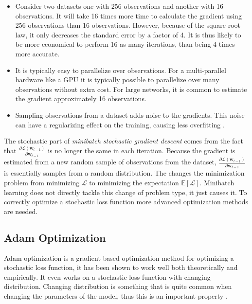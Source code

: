 \begin{itemize}
\item Consider two datasets one with 256 observations and another with 16 observations. It will take 16 times more time to calculate the gradient using 256 observations than 16 observations. However, because of the square-root law, it only decreases the standard error by a factor of 4. It is thus likely to be more economical to perform 16 as many iterations, than being 4 times more accurate.

\item It is typically easy to parallelize over observations. For a multi-parallel hardware like a GPU it is typically possible to parallelize over many observations without extra cost. For large networks, it is common to estimate the gradient approximately 16 observations.

\item Sampling observations from a dataset adds noise to the gradients. This noise can have a regularizing effect on the training, causing less overfitting \cite{deep-learning}.
\end{itemize}

The stochastic part of \textit{minibatch stochastic gradient descent} comes from the fact that $\frac{\partial \mathcal{L}(\mathbf{w}_{t-1})}{\partial \mathbf{w}_{t-1}}$ is no longer the same in each iteration. Because the gradient is estimated from a new random sample of observations from the dataset, $\frac{\partial \mathcal{L}(\mathbf{w}_{t-1})}{\partial \mathbf{w}_{t-1}}$ is essentially samples from a random distribution. The changes the minimization problem from minimizing $\mathcal{L}$ to minimizing the expectation $\mathbb{E}[\mathcal{L}]$. Minibatch learning does not directly tackle this change of problem type, it just causes it. To correctly optimize a stochastic loss function more advanced optimization methods are needed.

\subsection{Adam Optimization}

Adam optimization is a gradient-based optimization method for optimizing a stochastic loss function, it has been shown to work well both theoretically and empirically. It even works on a stochastic loss function with changing distribution. Changing distribution is something that is quite common when changing the parameters of the model, thus this is an important property \cite{adam-optimization}.

